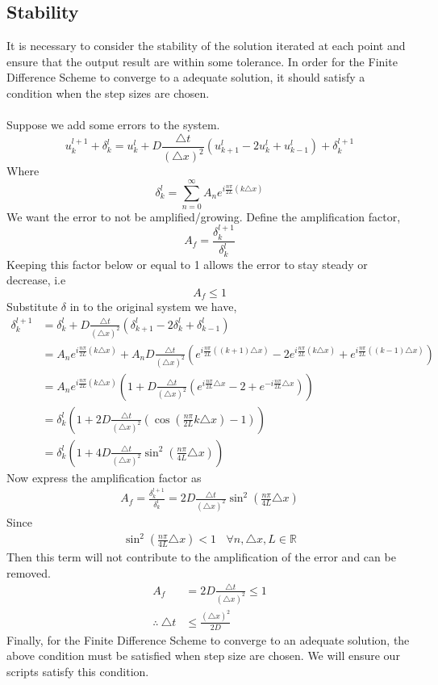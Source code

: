 \documentclass{article}
\begin{document}
\subsection{Stability}
It is necessary to consider the stability of the solution iterated at each point and ensure that the output result are within some tolerance. In order for the Finite Difference Scheme to converge to a adequate solution, it should satisfy a condition when the step sizes are chosen.
\\
\\
Suppose we add some errors to the system.
\[
	u^{l+1}_k + \delta^{l}_{k} = u^l_k+D\frac{\triangle t}{(\triangle x)^2}\left(u^l_{k+1}-2u^l_k+u^l_{k-1}\right) + \delta^{l+1}_{k}
\]
Where
\[
	\delta^{l}_{k} = \sum_{n=0}^{\infty} A_ne^{i\frac{n\pi}{2L}(k\triangle x)}
\]
We want the error to not be amplified/growing. Define the amplification factor,
\[
	A_f = \frac{\delta^{l+1}_{k}}{\delta^{l}_{k}}
\]
Keeping this factor below or equal to 1 allows the error to stay steady or decrease, i.e
\[
	A_f \leq 1
\]
Substitute $\delta$ in to the original system we have,
\[
	\begin{split}
		\delta^{l+1}_k &= \delta^l_k+D\frac{\triangle t}{(\triangle x)^2}\left(\delta^l_{k+1}-2\delta^l_k+\delta^l_{k-1}\right) \\
		&= A_ne^{i\frac{n\pi}{2L}(k\triangle x)}+A_n D\frac{\triangle t}{(\triangle x)^2}\left(e^{i\frac{n\pi}{2L}((k+1)\triangle x)}-2e^{i\frac{n\pi}{2L}(k\triangle x)}+e^{i\frac{n\pi}{2L}((k-1)\triangle x)}\right) \\
		&= A_ne^{i\frac{n\pi}{2L}(k\triangle x)}\left(1+D\frac{\triangle t}{(\triangle x)^2}\left(e^{i\frac{n\pi}{2L}\triangle x}-2+e^{-i\frac{n\pi}{2L}\triangle x}\right)\right) \\
		&= \delta^l_k\left(1+2D\frac{\triangle t}{(\triangle x)^2}\left(\cos{\left(\frac{n\pi}{2L}k\triangle x\right)}-1\right)\right) \\
		&= \delta^l_k\left(1+4D\frac{\triangle t}{(\triangle x)^2}\sin^2{\left(\frac{n\pi}{4L}\triangle x\right)}\right)
	\end{split}
\]
Now express the amplification factor as
\[
	\begin{split}
		A_f = \frac{\delta^{l+1}_{k}}{\delta^{l}_{k}} = 2D\frac{\triangle t}{(\triangle x)^2}\sin^2{\left(\frac{n\pi}{4L}\triangle x\right)}
	\end{split}
\]
Since
\[
	\begin{split}
		\sin^2{\left(\frac{n\pi}{4L}\triangle x\right)} < 1 \ \ \ \ \forall n,\triangle x,L \in \mathbb{R}
	\end{split}
\]
Then this term will not contribute to the amplification of the error and can be removed.
\[
	\begin{split}
		A_f &= 2D\frac{\triangle t}{(\triangle x)^2} \leq 1 \\
		\therefore \ \triangle t &\leq \frac{(\triangle x)^2}{2D}
	\end{split}
\]
Finally, for the Finite Difference Scheme to converge to an adequate solution, the above condition must be satisfied when step size are chosen. We will ensure our scripts satisfy this condition.
\newpage
\end{document}
